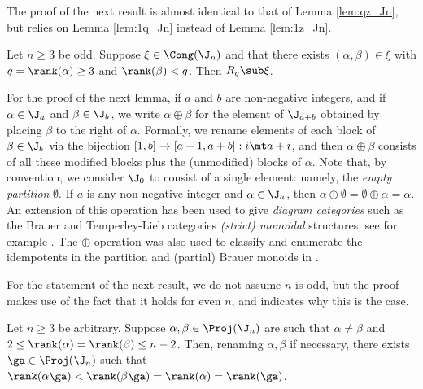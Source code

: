 The proof of the next result is almost identical to that of Lemma \ref{lem:qz_Jn}, but relies on Lemma \ref{lem:1q_Jn} instead of Lemma \ref{lem:1z_Jn}.


\begin{lemma}
\label{lem:pq2_Jn}
Let $n\geq3$ be odd.  Suppose $\xi\in\Cong(\J_n)$ and that there exists $(\alpha,\beta)\in\xi$ with $q=\rank(\alpha)\geq3$ and $\rank(\beta)<q$.  Then $R_q\sub\xi$. \epfres
\end{lemma}



For the proof of the next lemma, if $a$ and $b$ are non-negative integers, and if $\alpha\in\J_a$ and $\beta\in\J_b$, we write $\alpha\oplus\beta$ for the element of $\J_{a+b}$ obtained by placing $\beta$ to the right of $\alpha$.  Formally, we rename elements of each block of $\beta\in\J_b$ via the bijection $[1,b]\to[a+1,a+b]:i\mt a+i$, and then $\alpha\oplus\beta$ consists of all these modified blocks plus the (unmodified) blocks of $\alpha$.  Note that, by convention, we consider $\J_0$ to consist of a single element: namely, the \emph{empty partition} $\emptyset$.  If $a$ is any non-negative integer and $\alpha\in\J_a$, then $\alpha\oplus\emptyset=\emptyset\oplus\alpha=\alpha$.  An extension of this operation has been used to give \emph{diagram categories} such as the Brauer and Temperley-Lieb categories \emph{(strict) monoidal} structures; see for example \cite{LZ2015,Martin2008}.  The $\oplus$ operation was also used to classify and enumerate the idempotents in the partition and (partial) Brauer monoids in \cite{DEEFHHL1}.

For the statement of the next result, we do not assume $n$ is odd, but the proof makes use of the fact that it holds for even $n$, and indicates why this is the case.


\begin{lemma}\label{lem:proj2_Jn}
Let $n\geq3$ be arbitrary.  Suppose $\alpha,\beta\in\Proj(\J_n)$ are such that $\alpha\not=\beta$ and $2\leq\rank(\alpha)=\rank(\beta)\leq n-2$.  Then, renaming $\alpha,\beta$ if necessary, there exists $\ga\in\Proj(\J_n)$ such that $\rank(\alpha\ga)<\rank(\beta\ga)=\rank(\alpha)=\rank(\ga)$.
\end{lemma}


